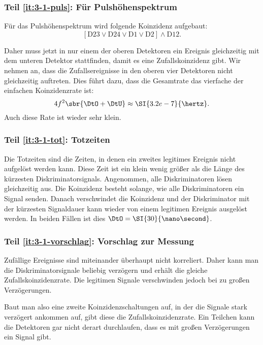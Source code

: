 \documentclass[11pt, ngerman, fleqn, DIV=15, headinclude, BCOR=2cm]{scrreprt}
\begin{document}
\subsubsection{Teil \ref{it:3-1-puls}: Für Pulshöhenspektrum}

Für das Pulshöhenspektrum wird folgende Koinzidenz aufgebaut:
\[
    [\mathrm D23 \lor \mathrm D24 \lor \mathrm D1 \lor \mathrm D2] \land
    \mathrm D12.
\]

Daher muss jetzt in nur einem der oberen Detektoren ein Ereignis gleichzeitig
mit dem unteren Detektor stattfinden, damit es eine Zufallskoinzidenz gibt. Wir
nehmen an, dass die Zufallsereignisse in den oberen vier Detektoren nicht
gleichzeitig auftreten. Dies führt dazu, dass die Gesamtrate das vierfache der
einfachen Koinzidenzrate ist:
\[
    4 f^2 \sbr{\DtO + \DtU} \approx \SI{3.2e-7}{\hertz}.
\]
Auch diese Rate ist wieder sehr klein.

\subsubsection{Teil \ref{it:3-1-tot}: Totzeiten}

Die Totzeiten sind die Zeiten, in denen ein zweites legitimes Ereignis nicht
aufgelöst werden kann. Diese Zeit ist ein klein wenig größer als die Länge des
kürzesten Diskriminatorsignals. Angenommen, alle Diskriminatoren lösen
gleichzeitig aus. Die Koinzidenz besteht solange, wie alle Diskriminatoren ein
Signal senden. Danach verschwindet die Koinzidenz und der Diskriminator mit der
kürzesten Signaldauer kann wieder von einem legitimen Ereignis ausgelöst
werden. In beiden Fällen ist dies $\DtO = \SI{30}{\nano\second}$.

\subsubsection{Teil \ref{it:3-1-vorschlag}: Vorschlag zur Messung}

Zufällige Ereignisse sind miteinander überhaupt nicht korreliert. Daher kann
man die Diskriminatorsignale beliebig verzögern und erhält die gleiche
Zufallskoinzidenzrate. Die legitimen Signale verschwinden jedoch bei zu großen
Verzögerungen.

Baut man also eine zweite Koinzidenzschaltungen auf, in der die Signale stark
verzögert ankommen auf, gibt diese die Zufallskoinzidenzrate. Ein Teilchen kann
die Detektoren gar nicht derart durchlaufen, dass es mit großen Verzögerungen
ein Signal gibt.
\end{document}
